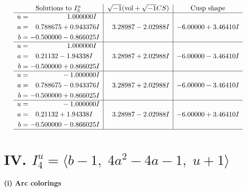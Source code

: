 \documentclass[1p]{elsarticle_modified}
\theoremstyle{definition}
\newcommand{\I}{\sqrt{-1}}
\begin{document}
$$\begin{array}{c|c|c}  
\text{Solutions to }I^u_{3}& \I (\text{vol} + \sqrt{-1}CS) & \text{Cusp shape}\\
 \hline 
\begin{aligned}
u &= \phantom{-0.000000 -}1.000000 I \\
a &= \phantom{-}0.788675 + 0.943376 I \\
b &= -0.500000 - 0.866025 I\end{aligned}
 & \phantom{-}3.28987 - 2.02988 I & -6.00000 + 3.46410 I \\ \hline\begin{aligned}
u &= \phantom{-0.000000 -}1.000000 I \\
a &= \phantom{-}0.21132 - 1.94338 I \\
b &= -0.500000 + 0.866025 I\end{aligned}
 & \phantom{-}3.28987 + 2.02988 I & -6.00000 - 3.46410 I \\ \hline\begin{aligned}
u &= \phantom{-0.000000 } -1.000000 I \\
a &= \phantom{-}0.788675 - 0.943376 I \\
b &= -0.500000 + 0.866025 I\end{aligned}
 & \phantom{-}3.28987 + 2.02988 I & -6.00000 - 3.46410 I \\ \hline\begin{aligned}
u &= \phantom{-0.000000 } -1.000000 I \\
a &= \phantom{-}0.21132 + 1.94338 I \\
b &= -0.500000 - 0.866025 I\end{aligned}
 & \phantom{-}3.28987 - 2.02988 I & -6.00000 + 3.46410 I\\
 \hline 
 \end{array}$$\newpage\newpage\renewcommand{\arraystretch}{1}
\centering \section*{IV. $I^u_{4}= \langle b-1,\;4 a^2-4 a-1,\;u+1 \rangle$}
\flushleft \textbf{(i) Arc colorings}\\
\end{document}
